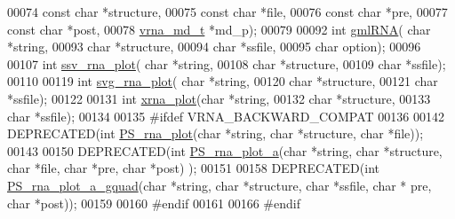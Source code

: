 \begin{DoxyCode}
00074                             \textcolor{keyword}{const} \textcolor{keywordtype}{char} *structure,
00075                             \textcolor{keyword}{const} \textcolor{keywordtype}{char} *file,
00076                             \textcolor{keyword}{const} \textcolor{keywordtype}{char} *pre,
00077                             \textcolor{keyword}{const} \textcolor{keywordtype}{char} *post,
00078                             \hyperlink{group__model__details_structvrna__md__s}{vrna\_md\_t}  *md\_p);
00079 
00092 \textcolor{keywordtype}{int} \hyperlink{group__plotting__utils_ga70834bc8c0aad4fe6824ff76ccb8f329}{gmlRNA}( \textcolor{keywordtype}{char} *\textcolor{keywordtype}{string},
00093             \textcolor{keywordtype}{char} *structure,
00094             \textcolor{keywordtype}{char} *ssfile,
00095             \textcolor{keywordtype}{char} option);
00096 
00107 \textcolor{keywordtype}{int} \hyperlink{group__plotting__utils_gadd368528755f9a830727b680243541df}{ssv\_rna\_plot}( \textcolor{keywordtype}{char} *\textcolor{keywordtype}{string},
00108                   \textcolor{keywordtype}{char} *structure,
00109                   \textcolor{keywordtype}{char} *ssfile);
00110 
00119 \textcolor{keywordtype}{int} \hyperlink{group__plotting__utils_gae7853539b5df98f294b4af434e979304}{svg\_rna\_plot}( \textcolor{keywordtype}{char} *\textcolor{keywordtype}{string},
00120                   \textcolor{keywordtype}{char} *structure,
00121                   \textcolor{keywordtype}{char} *ssfile);
00122 
00131 \textcolor{keywordtype}{int} \hyperlink{group__plotting__utils_ga2f6d5953e6a323df898896b8d6614483}{xrna\_plot}(\textcolor{keywordtype}{char} *\textcolor{keywordtype}{string},
00132               \textcolor{keywordtype}{char} *structure,
00133               \textcolor{keywordtype}{char} *ssfile);
00134 
00135 \textcolor{preprocessor}{#ifdef VRNA\_BACKWARD\_COMPAT}
00136 
00142 DEPRECATED(\textcolor{keywordtype}{int} \hyperlink{group__plotting__utils_ga0873c7cc4cd7a11c9a2cea19dde7e9c9}{PS\_rna\_plot}(\textcolor{keywordtype}{char} *\textcolor{keywordtype}{string}, \textcolor{keywordtype}{char} *structure, \textcolor{keywordtype}{char} *file));
00143 
00150 DEPRECATED(\textcolor{keywordtype}{int} \hyperlink{group__plotting__utils_ga47856b2504b566588785597b6ebb8271}{PS\_rna\_plot\_a}(\textcolor{keywordtype}{char} *\textcolor{keywordtype}{string}, \textcolor{keywordtype}{char} *structure, \textcolor{keywordtype}{char} *file, \textcolor{keywordtype}{char} *pre, \textcolor{keywordtype}{char} *post)
      );
00151 
00158 DEPRECATED(\textcolor{keywordtype}{int} \hyperlink{group__plotting__utils_ga32fa0f97625119e9d24dd2e7153abc4f}{PS\_rna\_plot\_a\_gquad}(\textcolor{keywordtype}{char} *\textcolor{keywordtype}{string}, \textcolor{keywordtype}{char} *structure, \textcolor{keywordtype}{char} *ssfile, \textcolor{keywordtype}{char} *
      pre, \textcolor{keywordtype}{char} *post));
00159 
00160 \textcolor{preprocessor}{#endif}
00161 
00166 \textcolor{preprocessor}{#endif}
\end{DoxyCode}
